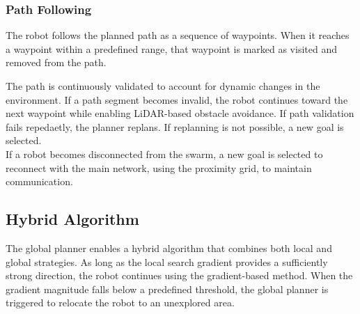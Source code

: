 \subsubsection{Path Following}
\label{sec:path_following}
The robot follows the planned path as a sequence of waypoints. When it reaches a waypoint within a predefined range, that waypoint is marked as visited and removed from the path.

The path is continuously validated to account for dynamic changes in the environment. If a path segment becomes invalid, the robot continues toward the next waypoint while enabling LiDAR-based obstacle avoidance. If path validation fails repedaetly, the planner replans. If replanning is not possible, a new goal is selected. \\

If a robot becomes disconnected from the swarm, a new goal is selected to reconnect with the main network, using the proximity grid, to maintain communication.

\subsection{Hybrid Algorithm}
The global planner enables a hybrid algorithm that combines both local and global strategies. As long as the local search gradient provides a sufficiently strong direction, the robot continues using the gradient-based method. When the gradient magnitude falls below a predefined threshold, the global planner is triggered to relocate the robot to an unexplored area.

